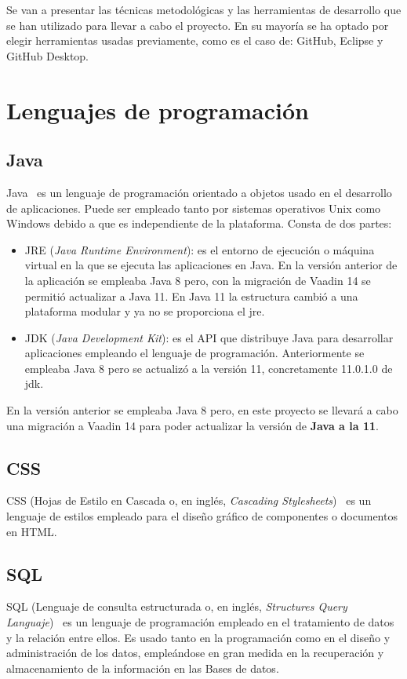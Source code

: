 
Se van a presentar las técnicas metodológicas y las herramientas de desarrollo que se han utilizado para llevar a cabo el proyecto. En su mayoría se ha optado por elegir herramientas usadas previamente, como es el caso de: GitHub, Eclipse y GitHub Desktop.

\section{Lenguajes de programación}

\subsection{Java}
Java~\cite{pagina_java} es un lenguaje de programación orientado a objetos usado en el desarrollo de aplicaciones. Puede ser empleado tanto por sistemas operativos Unix como Windows debido a que es independiente de la plataforma. 
Consta de dos partes: 
\begin{itemize}
	\tightlist
	\item JRE (\emph{Java Runtime Environment}): es el entorno de ejecución o máquina virtual en la que se ejecuta las aplicaciones en Java. En la versión anterior de la aplicación se empleaba Java 8 pero, con la migración de Vaadin 14 se permitió actualizar a Java 11. En Java 11 la estructura cambió a una plataforma modular y ya no se proporciona el jre. 
	\item JDK (\emph{Java Development Kit}): es el API que distribuye Java para desarrollar aplicaciones empleando el lenguaje de programación. Anteriormente se empleaba Java 8 pero se actualizó a la versión 11, concretamente 11.0.1.0 de jdk. 
\end{itemize}

En la versión anterior se empleaba Java 8 pero, en este proyecto se llevará a cabo una migración a Vaadin 14 para poder actualizar la versión de \textbf{Java a la 11}.

\subsection{CSS}
CSS (Hojas de Estilo en Cascada o, en inglés, \emph{Cascading Stylesheets})~\cite{pagina_css} es un lenguaje de estilos empleado para el diseño gráfico de componentes o documentos en HTML.

\subsection{SQL}
SQL (Lenguaje de consulta estructurada o, en inglés, \emph{Structures Query Languaje})~\cite{pagina_sql} es un lenguaje de programación empleado en el tratamiento de datos y la relación entre ellos. Es usado tanto en la programación como en el diseño y administración de los datos, empleándose en gran medida en la recuperación y almacenamiento de la información en las Bases de datos.

